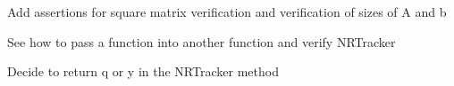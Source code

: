
\begin{DoxyRefList}
\item[Member \mbox{\hyperlink{utils_8h_ad2246d831bd56822936b616e92e12b76}{Linear\+Solve}} (Matrix\+Xd Amat, Vector\+Xd bvec)]\label{todo__todo000003}%
%
Add assertions for square matrix verification and verification of sizes of A and b  
\item[Member \mbox{\hyperlink{main_8cpp_abf9e6b7e6f15df4b525a2e7705ba3089}{main}} (int argc, char const $\ast$argv\mbox{[}\mbox{]})]\label{todo__todo000001}%
%
See how to pass a function into another function and verify N\+R\+Tracker  
\item[Member \mbox{\hyperlink{classRootTracker_a1747f62a28f6439be32a3284670630d0}{Root\+Tracker::N\+R\+Tracker}} (Vector\+Xd x, Vector\+Xd y, Vector\+Xd f, Matrix\+Xd Jfy, float eps=pow(10,-\/10))]\label{todo__todo000002}%
%
Decide to return q or y in the N\+R\+Tracker method 
\end{DoxyRefList}